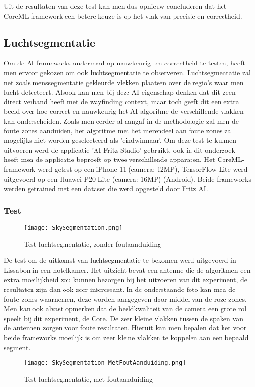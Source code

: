 Uit de resultaten van deze test kan men dus opnieuw concluderen dat het CoreML-framework een betere keuze is op het vlak van precisie en correctheid.

\subsection{Luchtsegmentatie}
Om de AI-frameworks andermaal op nauwkeurig -en correctheid te testen, heeft men ervoor gekozen om ook luchtsegmentatie te observeren. Luchtsegmentatie zal net zoals menssegmentatie gekleurde vlekken plaatsen over de regio's waar men lucht detecteert. Alsook kan men bij deze AI-eigenschap denken dat dit geen direct verband heeft met de wayfinding context, maar toch geeft dit een extra beeld over hoe correct en nauwkeurig het AI-algoritme de verschillende vlakken kan onderscheiden. Zoals men eerder al aangaf in de methodologie zal men de foute zones aanduiden, het algoritme met het merendeel aan foute zones zal mogelijks niet worden geselecteerd als 'eindwinnaar'. Om deze test te kunnen uitvoeren werd de applicatie 'AI Fritz Studio' gebruikt, ook in dit onderzoek heeft men de applicatie beproeft op twee verschillende apparaten. Het CoreML-framework werd getest op een iPhone 11 (camera: 12MP), TensorFlow Lite werd uitgevoerd op een Huawei P20 Lite (camera: 16MP) (Android). Beide frameworks werden getrained met een dataset die werd opgesteld door Fritz AI.

\subsubsection{Test}
\begin{figure}[H]
	\centering
	\texttt{[image: SkySegmentation.png]}
	\caption{Test luchtsegmentatie, zonder foutaanduiding}
\end{figure}

De test om de uitkomst van luchtsegmentatie te bekomen werd uitgevoerd in Lissabon in een hotelkamer. Het uitzicht bevat een antenne die de algoritmen een extra moeilijkheid zou kunnen bezorgen bij het uitvoeren van dit experiment, de resultaten zijn dan ook zeer interessant. In de onderstaande foto kan men de foute zones waarnemen, deze worden  aangegeven door middel van de roze zones. Men kan ook alvast opmerken dat de beeldkwaliteit van de camera een grote rol speelt bij dit experiment, de Core. De zeer kleine vlakken tussen de spaken van de antennen zorgen voor foute resultaten. Hieruit kan men bepalen dat het voor beide frameworks moeilijk is om zeer kleine vlakken te koppelen aan een bepaald segment.
\begin{figure}[H]
	\centering
	\texttt{[image: SkySegmentation\_MetFoutAanduiding.png]}
	\caption{Test luchtsegmentatie, met foutaanduiding}
\end{figure}

